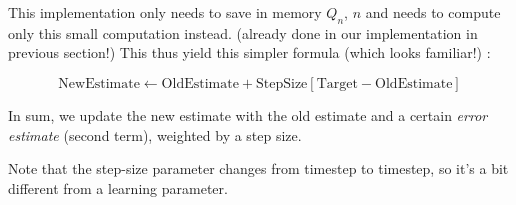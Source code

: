 \documentclass{article}
\begin{document}
This implementation only needs to save in memory $Q_n$, $n$ and needs to compute only this small computation instead. (already done in our implementation in previous section!) This thus yield this simpler formula (which looks familiar!) : 

\begin{equation}
\text{NewEstimate} \leftarrow \text{OldEstimate} + \text{StepSize} \left[ \text{Target} - \text{OldEstimate} \right]
\end{equation}

In sum, we update the new estimate with the old estimate and a certain \textit{error estimate} (second term), weighted by a step size.

Note that the step-size parameter changes from timestep to timestep, so it's a bit different from a learning parameter.
\end{document}

